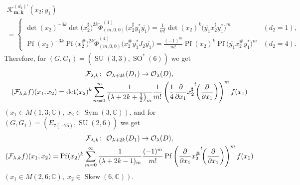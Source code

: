 \documentclass[pdftex]{sigma}
\numberwithin{equation}{section}
\newcommand{\ds}{\displaystyle}
\newcommand{\bk}{\mathbf{k}}
\newcommand{\bm}{\mathbf{m}}
\newcommand{\BC}{\mathbb{C}}
\newcommand{\cF}{\mathcal{F}}
\newcommand{\cK}{\mathcal{K}}
\newcommand{\cO}{\mathcal{O}}
\newcommand{\Pf}{\operatorname{Pf}}
\newcommand{\Sym}{\operatorname{Sym}}
\newcommand{\Skew}{\operatorname{Skew}}
\begin{document}
\begin{gather*}
 \cK_{\bm,\bk}^{(d_2)\prime}(x_2;y_1) \\
 =\begin{cases} \ds \det(x_2)^{-3k}\det\big(x_2^\sharp\big)^{2k}\tilde{\Phi}_{(m,0,0)}^{(1)}\big(x_2^\sharp y_1^*\overline{y_1}\big)
=\frac{1}{m!}\det(x_2)^k\big(\overline{y_1}x_2^\sharp y_1^*\big)^m & (d_2=1), \\
\ds \Pf(x_2)^{-3k}\Pf\big(x_2^\#\big)^{2k}\tilde{\Phi}_{(m,0,0)}^{(4)}\big(x_2^\#y_1^*J_2\overline{y_1}\big)
=\frac{(-1)^m}{m!}\Pf(x_2)^k\Pf\big(\overline{y_1}x_2^\#y_1^*\big)^m & (d_2=4). \end{cases}
\end{gather*}
Therefore, for $(G,G_1)=(\operatorname{SU}(3,3),\operatorname{SO}^*(6))$ we get
\begin{gather*}
\cF_{\lambda,k}\colon \ \cO_{\lambda+2k}(D_1)\to \cO_\lambda(D), \\
(\cF_{\lambda,k}f)(x_1,x_2)=\det(x_2)^k\sum_{m=0}^\infty \frac{1}{\left(\lambda+2k+\frac{1}{2}\right)_m}\frac{1}{m!}
\left(\frac{1}{4}\frac{\partial}{\partial x_1}x_2^\sharp
{\vphantom{\biggl(}}^t\!\!\left(\frac{\partial}{\partial x_1}\right)\right)^mf(x_1)
\end{gather*}
$(x_1\in M(1,3;\BC), \;x_2 \in \Sym(3,\BC))$, and for $(G,G_1)=(E_{7(-25)},\operatorname{SU}(2,6))$ we get
\begin{gather*}
\cF_{\lambda,k}\colon \ \cO_{\lambda+2k}(D_1)\to \cO_\lambda(D), \\
(\cF_{\lambda,k}f)(x_1,x_2)
=\Pf(x_2)^k\sum_{m=0}^\infty \frac{1}{(\lambda+2k-1)_m}\frac{(-1)^m}{m!}
\Pf\left(\frac{\partial}{\partial x_1}x_2^\#
{\vphantom{\biggl(}}^t\!\!\left(\frac{\partial}{\partial x_1}\right)\right)^mf(x_1)
\end{gather*}
$(x_1\in M(2,6;\BC), \;x_2 \in \Skew(6,\BC))$.
\end{document}
